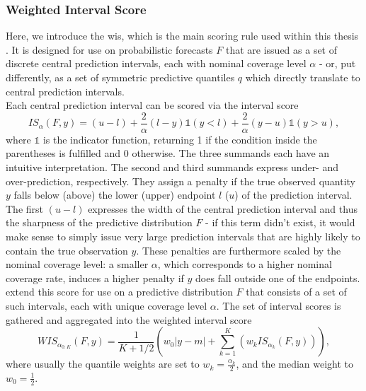 \subsubsection{Weighted Interval Score} \label{ssub:weighted_interval_score}
Here, we introduce the \ac{wis}, which is the main scoring rule used within this thesis \cite{bracher_evaluating_2021}. It is designed for use on probabilistic forecasts \cite{european_covid-19_forecast_hub_european_2021} $F$ that are issued as a set of discrete central prediction intervals, each with nominal coverage level $\alpha$ - or, put differently, as a set of symmetric predictive quantiles $q$ which directly translate to central prediction intervals. \\
Each central prediction interval can be scored via the interval score \citep{gneiting_strictly_2007}
\begin{equation}
IS_{\alpha}(F, y) = (u-l) + \frac{2}{\alpha}(l - y)\mathbb{1}(y < l) + \frac{2}{\alpha}(y - u)\mathbb{1}(y > u),
\end{equation}
where $\mathbb{1}$ is the indicator function, returning 1 if the condition inside the parentheses is fulfilled and 0 otherwise. The three summands each have an intuitive interpretation. The second and third summands express under- and over-prediction, respectively. They assign a penalty if the true observed quantity $y$ falls below (above) the lower (upper) endpoint $l$ ($u$) of the prediction interval. The first $(u-l)$ expresses the width of the central prediction interval and thus the sharpness of the predictive distribution $F$ - if this term didn't exist, it would make sense to simply issue very large prediction intervals that are highly likely to contain the true observation $y$. These penalties are furthermore scaled by the nominal coverage level: a smaller $\alpha$, which corresponds to a higher nominal coverage rate, induces a higher penalty if $y$ does fall outside one of the endpoints. \\
\cite{bracher_evaluating_2021} extend this score for use on a predictive distribution $F$ that consists of a set of such intervals, each with unique coverage level $\alpha$. The set of interval scores is gathered and aggregated into the weighted interval score 
\begin{equation}
WIS_{\alpha_{0:K}}(F,y) = \frac{1}{K + 1/2}\left(w_{0}|y-m| + \sum_{k=1}^{K}\left(w_k IS_{\alpha_{k}}(F, y)\right)\right),
\end{equation}
where usually the quantile weights are set to $w_k = \frac{\alpha_{k}}{2}$, and the median weight to $w_{0} = \frac{1}{2}$.\\
